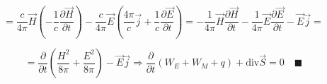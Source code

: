 \[
= \frac{c}{4\pi} \vec{H} \left( -\frac{1}{c}\frac{\partial\vec{H}}{\partial t}\right) -\frac{c}{4 \pi} \vec{E}\left( \frac{4\pi}{c}\vec{j}+\frac{1}{c}\frac{\partial\vec{E}}{\partial t}    \right)   =-\frac{1}{4\pi}\vec{H}\frac{\partial\vec{H}}{\partial t}-\frac{1}{4\pi}\vec{E}\frac{\partial\vec{E}}{\partial t}-\vec{E}\vec{j}=    
\]

\[
=\frac{\partial}{\partial t}\left( \frac{H^2}{8\pi}+\frac{E^2}{8\pi}   \right) -\vec{E}\vec{j}\Rightarrow \frac{\partial}{\partial t} \left( W_E+W_M+q \right)+\mathrm{div}\vec{S}=0\quad \blacksquare 
\]
